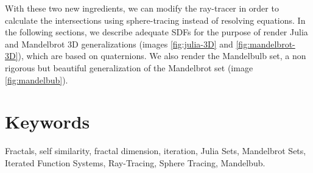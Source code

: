 With these two new ingredients, we can modify the ray-tracer in order to calculate the intersections using sphere-tracing instead of resolving equations. In the following sections, we describe adequate SDFs for the purpose of render Julia and Mandelbrot 3D generalizations (images \ref{fig:julia-3D} and \ref{fig:mandelbrot-3D}), which are based on quaternions. We also render the Mandelbulb set, a non rigorous but beautiful generalization of the Mandelbrot set (image \ref{fig:mandelbub}).

\section*{Keywords}

Fractals, self similarity, fractal dimension, iteration, Julia Sets, Mandelbrot Sets, Iterated Function Systems, Ray-Tracing, Sphere Tracing, Mandelbub. 